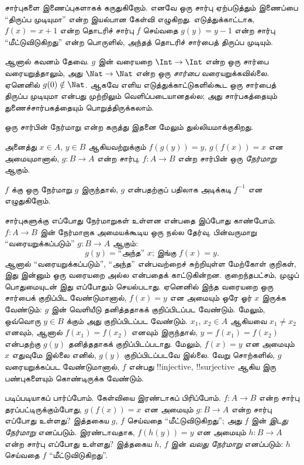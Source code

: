 \documentclass[../../../include/open-logic-section]{subfiles}
\begin{document}

\begin{explain}
சார்புகளை இணைப்புகளாகக் கருதுகிறோம். எனவே ஒரு சார்பு ஏற்படுத்தும்
இணைப்பை “திருப்ப முடியுமா” என்ற இயல்பான கேள்வி எழுகிறது.
எடுத்துக்காட்டாக, $f(x) = x + 1$ என்ற தொடரிச் சார்பு $f$ செய்வதை
$g(y) = y - 1$ என்ற சார்பு “மீட்டுவிடுகிறது” என்ற பொருளில்,
அந்தத் தொடரிச் சார்பைத் திருப்ப முடியும்.

ஆனால் கவனம் தேவை. $g$ இன் வரையறை $\Int \to \Int$ என்ற
ஒரு சார்பை வரையறுத்தாலும், அது $\Nat
\to \Nat$ என்ற ஒரு \emph{சார்பை} வரையறுக்கவில்லை.
ஏனெனில் $g(0) \notin \Nat$.
ஆகவே எளிய எடுத்துக்காட்டுகளில்கூட ஒரு சார்பைத் திருப்ப முடியுமா
என்பது முற்றிலும் வெளிப்படையானதல்ல; அது சார்பகத்தையும்
துணைச்சார்பகத்தையும் பொறுத்திருக்கலாம்.

ஒரு சார்பின் நேர்மாறு என்ற கருத்து இதனை மேலும் துல்லியமாக்குகிறது.
\end{explain}

\begin{defn}
அனைத்து $x \in A$, $y \in B$ ஆகியவற்றுக்கும்
$f(g(y)) = y$, $g(f(x)) = x$ என அமையுமானால்,
$g \colon B \to A$ என்ற சார்பு, $f
\colon A \to B$ என்ற சார்பின் ஒரு \emph{நேர்மாறு} ஆகும்.
\end{defn}

$f$ க்கு ஒரு நேர்மாறு $g$ இருந்தால், $g$ என்பதற்குப் பதிலாக
அடிக்கடி $f^{-1}$ என எழுதுகிறோம்.

\begin{explain}
சார்புகளுக்கு எப்போது நேர்மாறுகள் உள்ளன என்பதை இப்போது காண்போம்.
$f\colon A \to B$ இன் நேர்மாறாக அமையக்கூடிய ஒரு நல்ல தேர்வு,
பின்வருமாறு “வரையறுக்கப்படும்” $g\colon B \to A$ ஆகும்:
\[
g(y) = \text{“அந்த” $x$; இங்கு $f(x) = y$.}
\]
ஆனால் “வரையறுக்கப்படும்”, “அந்த” என்பவற்றைச் சுற்றியுள்ள மேற்கோள்
குறிகள், இது இன்னும் ஒரு வரையறை அல்ல என்பதைக் காட்டுகின்றன.
குறைந்தபட்சம், முழுப் பொதுமையுடன் இது எப்போதும் செயல்படாது.
ஏனெனில் இந்த வரையறை ஒரு சார்பைக் குறிப்பிட வேண்டுமானால்,
$f(x) =
y$ என அமையும் ஒரே ஓர் $x$ இருக்க வேண்டும்:
$g$ இன் வெளியீடு தனித்ததாகக் குறிப்பிடப்பட வேண்டும்.
மேலும், ஒவ்வொரு $y \in B$ க்கும் அது குறிப்பிடப்பட வேண்டும்.
$x_1$, $x_2 \in
A$ ஆகியவை $x_1 \neq x_2$ எனவும், ஆனால்
$f(x_1) = f(x_2)$ எனவும் இருந்தால்,
$y = f(x_1) = f(x_2)$ என்பதற்கு $g(y)$ தனித்ததாகக்
குறிப்பிடப்படாது. மேலும், $f(x) = y$ என அமையும்
$x$ எதுவுமே இல்லை எனில், $g(y)$ குறிப்பிடப்படவே இல்லை.
வேறு சொற்களில், $g$ வரையறுக்கப்பட வேண்டுமானால்,
$f$ என்பது !!{injective}, !!{surjective} ஆகிய இரு பண்புகளையும்
கொண்டிருக்க வேண்டும்.

படிப்படியாகப் பார்ப்போம். கேள்வியை இரண்டாகப் பிரிப்போம்.
$f\colon A \to B$ என்ற சார்பு தரப்பட்டிருக்கும்போது,
$g(f(x)) = x$ என அமையும் $g\colon B \to A$ என்ற சார்பு
எப்போது உள்ளது? இத்தகைய $g$, $f$ செய்வதை “மீட்டுவிடுகிறது”;
அது $f$ இன் \emph{இடது நேர்மாறு} எனப்படும்.
இரண்டாவதாக, $f(h(y)) = y$ என அமையும்
$h\colon B \to A$ என்ற சார்பு எப்போது உள்ளது?
இத்தகைய $h$, $f$ இன் \emph{வலது நேர்மாறு} எனப்படும்:
$h$ செய்வதை $f$ “மீட்டுவிடுகிறது”.
\end{explain}
\end{document}

